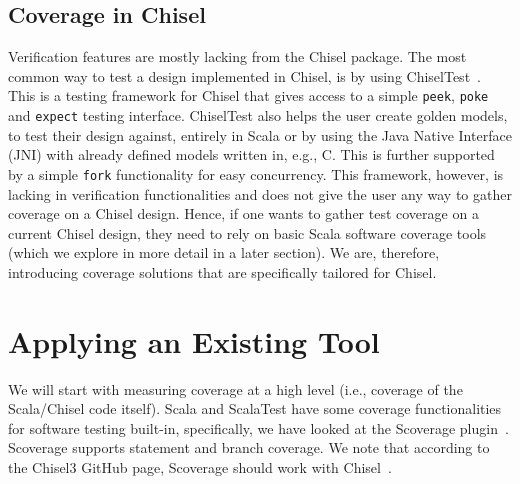 \documentclass[conference]{IEEEtran}
\newcommand{\martin}[1]{{\color{blue} Martin: #1}}
\begin{document}
\subsection{Coverage in Chisel} 
Verification features are mostly lacking from the Chisel package. 
The most common way to test a design implemented in Chisel, is by using ChiselTest~\cite{chisel:tester2}. 
This is a testing framework for Chisel that gives access to a simple \texttt{peek}, \texttt{poke} and \texttt{expect} testing interface. 
ChiselTest also helps the user create golden models, to test their design against, entirely in Scala or by using the Java Native Interface (JNI) with already defined models written in, e.g., C. This is further supported by a simple \texttt{fork} functionality for easy concurrency.  
This framework, however, is lacking in verification functionalities and does not give the user any way to gather coverage on a Chisel design.
Hence, if one wants to gather test coverage on a current Chisel design, they need to rely on basic Scala software coverage tools (which we explore in more detail in a later section). 
We are, therefore, introducing coverage solutions that are specifically tailored for Chisel.

\section{Applying an Existing Tool}
We will start with measuring coverage at a high level (i.e., coverage of the Scala/Chisel code itself). Scala and ScalaTest have some coverage functionalities for software testing built-in, specifically, we have looked at the Scoverage plugin~\cite{scoverage}. Scoverage supports statement and branch coverage. We note that according to the Chisel3 GitHub page, Scoverage should work with Chisel~\cite{chisel:scoverage}.

\end{document}
